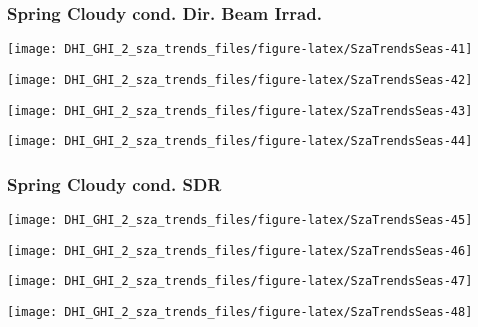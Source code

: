 \documentclass[
  10pt,
  a4paper,oneside]{article}
\begin{document}
\newpage

\hypertarget{spring-cloudy-cond.-dir.-beam-irrad.}{%
\subsubsection{Spring Cloudy cond. Dir. Beam Irrad.}\label{spring-cloudy-cond.-dir.-beam-irrad.}}

\begin{center}\texttt{[image: DHI\_GHI\_2\_sza\_trends\_files/figure-latex/SzaTrendsSeas-41]} \end{center}

\begin{center}\texttt{[image: DHI\_GHI\_2\_sza\_trends\_files/figure-latex/SzaTrendsSeas-42]} \end{center}

\begin{center}\texttt{[image: DHI\_GHI\_2\_sza\_trends\_files/figure-latex/SzaTrendsSeas-43]} \end{center}

\begin{center}\texttt{[image: DHI\_GHI\_2\_sza\_trends\_files/figure-latex/SzaTrendsSeas-44]} \end{center}

\newpage

\hypertarget{spring-cloudy-cond.-sdr}{%
\subsubsection{Spring Cloudy cond. SDR}\label{spring-cloudy-cond.-sdr}}

\begin{center}\texttt{[image: DHI\_GHI\_2\_sza\_trends\_files/figure-latex/SzaTrendsSeas-45]} \end{center}

\begin{center}\texttt{[image: DHI\_GHI\_2\_sza\_trends\_files/figure-latex/SzaTrendsSeas-46]} \end{center}

\begin{center}\texttt{[image: DHI\_GHI\_2\_sza\_trends\_files/figure-latex/SzaTrendsSeas-47]} \end{center}

\begin{center}\texttt{[image: DHI\_GHI\_2\_sza\_trends\_files/figure-latex/SzaTrendsSeas-48]} \end{center}
\end{document}
